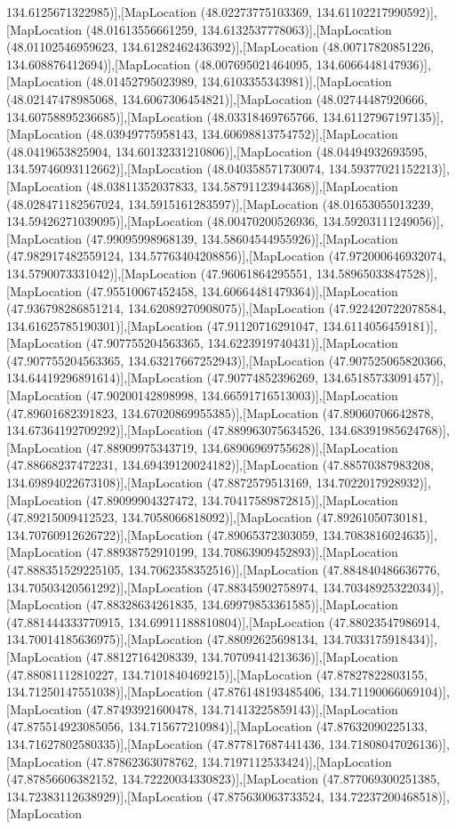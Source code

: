 134.6125671322985)],[MapLocation (48.02273775103369, 134.61102217990592)],[MapLocation (48.01613556661259, 134.6132537778063)],[MapLocation (48.01102546959623, 134.61282462436392)],[MapLocation (48.00717820851226, 134.608876412694)],[MapLocation (48.007695021464095, 134.6066448147936)],[MapLocation (48.01452795023989, 134.6103355343981)],[MapLocation (48.02147478985068, 134.6067306454821)],[MapLocation (48.02744487920666, 134.60758895236685)],[MapLocation (48.03318469765766, 134.61127967197135)],[MapLocation (48.03949775958143, 134.60698813754752)],[MapLocation (48.0419653825904, 134.60132331210806)],[MapLocation (48.04494932693595, 134.59746093112662)],[MapLocation (48.040358571730074, 134.59377021152213)],[MapLocation (48.03811352037833, 134.58791123944368)],[MapLocation (48.028471182567024, 134.5915161283597)],[MapLocation (48.01653055013239, 134.59426271039095)],[MapLocation (48.00470200526936, 134.59203111249056)],[MapLocation (47.99095998968139, 134.58604544955926)],[MapLocation (47.982917482559124, 134.57763404208856)],[MapLocation (47.972000646932074, 134.5790073331042)],[MapLocation (47.96061864295551, 134.58965033847528)],[MapLocation (47.95510067452458, 134.60664481479364)],[MapLocation (47.936798286851214, 134.62089270908075)],[MapLocation (47.922420722078584, 134.61625785190301)],[MapLocation (47.91120716291047, 134.6114056459181)],[MapLocation (47.907755204563365, 134.6223919740431)],[MapLocation (47.907755204563365, 134.63217667252943)],[MapLocation (47.907525065820366, 134.64419296891614)],[MapLocation (47.90774852396269, 134.65185733091457)],[MapLocation (47.90200142898998, 134.66591716513003)],[MapLocation (47.89601682391823, 134.67020869955385)],[MapLocation (47.89060706642878, 134.67364192709292)],[MapLocation (47.889963075634526, 134.68391985624768)],[MapLocation (47.88909975343719, 134.68906969755628)],[MapLocation (47.88668237472231, 134.69439120024182)],[MapLocation (47.88570387983208, 134.69894022673108)],[MapLocation (47.8872579513169, 134.7022017928932)],[MapLocation (47.89099904327472, 134.70417589872815)],[MapLocation (47.89215009412523, 134.7058066818092)],[MapLocation (47.89261050730181, 134.70760912626722)],[MapLocation (47.89065372303059, 134.7083816024635)],[MapLocation (47.88938752910199, 134.70863909452893)],[MapLocation (47.888351529225105, 134.7062358352516)],[MapLocation (47.884840486636776, 134.70503420561292)],[MapLocation (47.88345902758974, 134.70348925322034)],[MapLocation (47.88328634261835, 134.69979853361585)],[MapLocation (47.881444333770915, 134.69911188810804)],[MapLocation (47.88023547986914, 134.70014185636975)],[MapLocation (47.88092625698134, 134.7033175918434)],[MapLocation (47.88127164208339, 134.70709414213636)],[MapLocation (47.88081112810227, 134.7101840469215)],[MapLocation (47.87827822803155, 134.71250147551038)],[MapLocation (47.876148193485406, 134.71190066069104)],[MapLocation (47.87493921600478, 134.71413225859143)],[MapLocation (47.875514923085056, 134.715677210984)],[MapLocation (47.87632090225133, 134.71627802580335)],[MapLocation (47.877817687441436, 134.71808047026136)],[MapLocation (47.87862363078762, 134.7197112533424)],[MapLocation (47.87856606382152, 134.72220034330823)],[MapLocation (47.877069300251385, 134.72383112638929)],[MapLocation (47.875630063733524, 134.72237200468518)],[MapLocation 